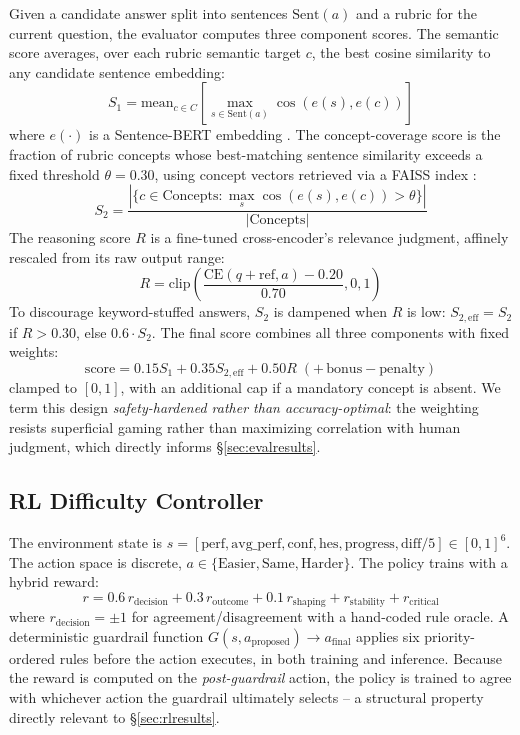 \documentclass[conference]{IEEEtran}
\begin{document}
Given a candidate answer split into sentences $\mathrm{Sent}(a)$ and a rubric for the current question, the evaluator computes three component scores. The semantic score averages, over each rubric semantic target $c$, the best cosine similarity to any candidate sentence embedding:
\begin{equation}
S_1 = \mathrm{mean}_{c \in C} \left[ \max_{s \in \mathrm{Sent}(a)} \cos(e(s), e(c)) \right]
\end{equation}
where $e(\cdot)$ is a Sentence-BERT embedding \cite{reimers2019}. The concept-coverage score is the fraction of rubric concepts whose best-matching sentence similarity exceeds a fixed threshold $\theta = 0.30$, using concept vectors retrieved via a FAISS index \cite{johnson2019}:
\begin{equation}
S_2 = \frac{|\{c \in \mathrm{Concepts} : \max_{s} \cos(e(s), e(c)) > \theta\}|}{|\mathrm{Concepts}|}
\end{equation}
The reasoning score $R$ is a fine-tuned cross-encoder's relevance judgment, affinely rescaled from its raw output range:
\begin{equation}
R = \mathrm{clip}\!\left( \frac{\mathrm{CE}(q{+}\mathrm{ref}, a) - 0.20}{0.70}, 0, 1 \right)
\end{equation}
To discourage keyword-stuffed answers, $S_2$ is dampened when $R$ is low: $S_{2,\mathrm{eff}} = S_2$ if $R > 0.30$, else $0.6 \cdot S_2$. The final score combines all three components with fixed weights:
\begin{equation}
\mathrm{score} = 0.15 S_1 + 0.35 S_{2,\mathrm{eff}} + 0.50 R \;(+\,\mathrm{bonus} - \mathrm{penalty})
\end{equation}
clamped to $[0,1]$, with an additional cap if a mandatory concept is absent. We term this design \emph{safety-hardened rather than accuracy-optimal}: the weighting resists superficial gaming rather than maximizing correlation with human judgment, which directly informs \S\ref{sec:evalresults}.

\subsection{RL Difficulty Controller}
\label{sec:rl}

The environment state is $s = [\mathrm{perf}, \mathrm{avg\_perf}, \mathrm{conf}, \mathrm{hes}, \mathrm{progress}, \mathrm{diff}/5] \in [0,1]^6$. The action space is discrete, $a \in \{\mathrm{Easier}, \mathrm{Same}, \mathrm{Harder}\}$. The policy trains with a hybrid reward:
\begin{equation}
r = 0.6\,r_{\mathrm{decision}} + 0.3\,r_{\mathrm{outcome}} + 0.1\,r_{\mathrm{shaping}} + r_{\mathrm{stability}} + r_{\mathrm{critical}}
\end{equation}
where $r_{\mathrm{decision}} = \pm 1$ for agreement/disagreement with a hand-coded rule oracle. A deterministic guardrail function $G(s, a_{\mathrm{proposed}}) \rightarrow a_{\mathrm{final}}$ applies six priority-ordered rules before the action executes, in both training and inference. Because the reward is computed on the \emph{post-guardrail} action, the policy is trained to agree with whichever action the guardrail ultimately selects -- a structural property directly relevant to \S\ref{sec:rlresults}.
\end{document}
